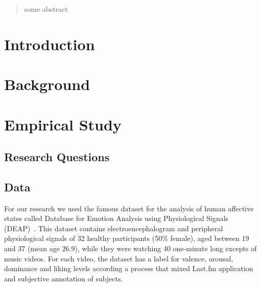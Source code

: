 \documentclass{sig-alternate}
\begin{document}

\maketitle
\begin{abstract}
some abstract
\end{abstract}



\section{Introduction}





\section{Background}

\section{Empirical Study}


\subsection{Research Questions}
	
\subsection{Data}

For our research we used the famous dataset for the analysis of human affective states called Database for Emotion Analysis using Physiological Signals (DEAP)~\cite{deap2011}. This dataset contains electroencephalogram and peripheral physiological signals of 32 healthy participants (50\% female), aged between 19 and 37 (mean age 26.9), while they were watching 40 one-minute long excepts of music videos. For each video, the dataset has a label for valence, arousal, dominance and liking levels according a process that mixed Last.fm application and subjective annotation of subjects. 
\end{document}
